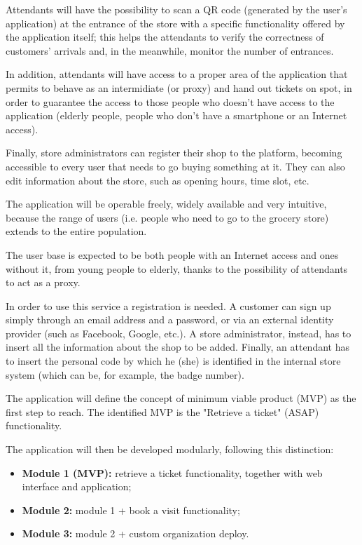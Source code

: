 \documentclass[table, 12pt]{article}
\begin{document}
Attendants will have the possibility to scan a QR code (generated by the user's application) at the entrance of the store with a specific functionality offered by the application itself; this helps the attendants to verify the correctness of customers' arrivals and, in the meanwhile, monitor the number of entrances.

In addition, attendants will have access to a proper area of the application that permits to behave as an intermidiate (or proxy) and hand out tickets on spot, in order to guarantee the access to those people who doesn't have access to the application (elderly people, people who don't have a smartphone or an Internet access).

Finally, store administrators can register their shop to the platform, becoming accessible to every user that needs to go buying something at it. They can also edit information about the store, such as opening hours, time slot, etc.

The application will be operable freely, widely available and very intuitive, because the range of users (i.e. people who need to go to the grocery store) extends to the entire population.

The user base is expected to be both people with an Internet access and ones without it, from young people to elderly, thanks to the possibility of attendants to act as a proxy.

In order to use this service a registration is needed. A customer can sign up simply through an email address and a password, or via an external identity provider (such as Facebook, Google, etc.). A store administrator, instead, has to insert all the information about the shop to be added. Finally, an attendant has to insert the personal code by which he (she) is identified in the internal store system (which can be, for example, the badge number).

The application will define the concept of minimum viable product (MVP) as the first step to reach. The identified MVP is the "Retrieve a ticket" (ASAP) functionality.

The application will then be developed modularly, following this distinction:
\begin{itemize}
    \item \textbf{Module 1 (MVP):} retrieve a ticket functionality, together with web interface and application;
    \item \textbf{Module 2:} module 1 + book a visit functionality;
    \item \textbf{Module 3:} module 2 + custom organization deploy.
\end{itemize}
\end{document}
